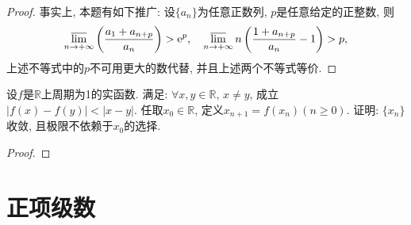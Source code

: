 \begin{quizb}
\begin{proof}
事实上, 本题有如下推广: 设\(\{a_n\}\)为任意正数列, \(p\)是任意给定的正整数, 则\[\varlimsup_{n\rightarrow+\infty}\left(\frac{a_1+a_{n+p}}{a_n}\right)>\mathrm{e}^p,\quad\varlimsup_{n\rightarrow+\infty}n\left(\frac{1+a_{n+p}}{a_n}-1\right)>p,\]上述不等式中的\(p\)不可用更大的数代替, 并且上述两个不等式等价.
\end{proof}
\woe 设\(f\)是\(\mathbb{R}\)上周期为1的实函数. 满足: \(\forall x,y\in\mathbb{R},\,x\ne y\), 成立\(|f(x)-f(y)|<|x-y|\). 任取\(x_0\in\mathbb{R}\), 定义\(x_{n+1}=f(x_n)(n\geqslant 0)\). 证明: \(\{x_n\}\)收敛, 且极限不依赖于\(x_0\)的选择.
\begin{proof}

\end{proof}
\end{quizb}
\section{正项级数}
